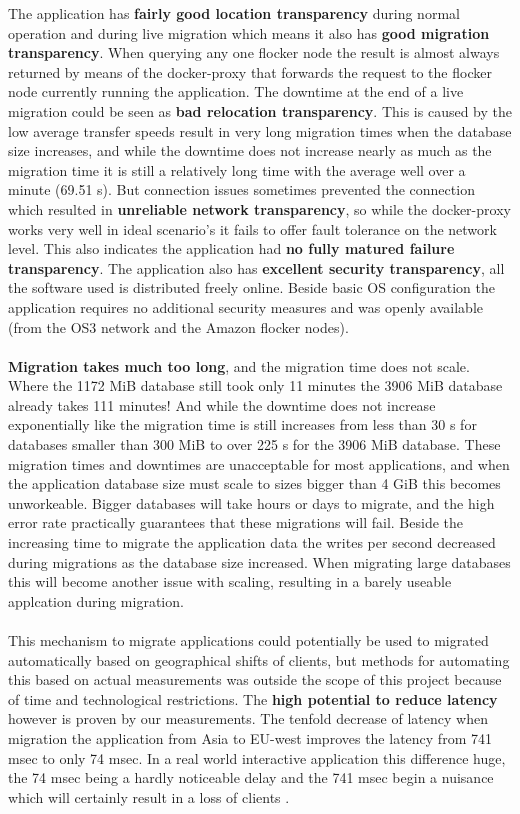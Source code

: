 \documentclass{article}
\begin{document}
The application has \textbf{fairly good location transparency} during normal operation and during live migration which means it also has \textbf{good migration transparency}. When querying any one flocker node the result is almost always returned by means of the docker-proxy that forwards the request to the flocker node currently running the application.
The downtime at the end of a live migration could be seen as \textbf{bad relocation transparency}. This is caused by the low average transfer speeds result in very long migration times when the database size increases, and while the downtime does not increase nearly as much as the migration time it is still a relatively long time with the average well over a minute (69.51 s).
But connection issues sometimes prevented the connection which resulted in \textbf{unreliable network transparency}, so while the docker-proxy works very well in ideal scenario's it fails to offer fault tolerance on the network level. This also indicates the application had \textbf{no fully matured failure transparency}.
The application also has \textbf{excellent security transparency}, all the software used is distributed freely online. Beside basic OS configuration the application requires no additional security measures and was openly available (from the OS3 network and the Amazon flocker nodes). \\ \\

\textbf{Migration takes much too long}, and the migration time does not scale. Where the 1172 MiB database still took only 11 minutes the 3906 MiB database already takes 111 minutes! And while the downtime does not increase exponentially like the migration time is still increases from less than 30 s for databases smaller than 300 MiB to over 225 s for the 3906 MiB database. These migration times and downtimes are unacceptable for most applications, and when the application database size must scale to sizes bigger than 4 GiB this becomes unworkeable. Bigger databases will take hours or days to migrate, and the high error rate practically guarantees that these migrations will fail. Beside the increasing time to migrate the application data the writes per second decreased during migrations as the database size increased. When migrating large databases this will become another issue with scaling, resulting in a barely useable applcation during migration. \\ \\

This mechanism to migrate applications could potentially be used to migrated automatically based on geographical shifts of clients, but methods for automating this based on actual measurements was outside the scope of this project because of time and technological restrictions. The \textbf{high potential to reduce latency} however is proven by our measurements. The tenfold decrease of latency when migration the application from Asia to EU-west improves the latency from 741 msec to only 74 msec. In a real world interactive application this difference huge, the 74 msec being a hardly noticeable delay and the 741 msec begin a nuisance which will certainly result in a loss of clients \cite{google_msec}. \\ \\
\end{document}
